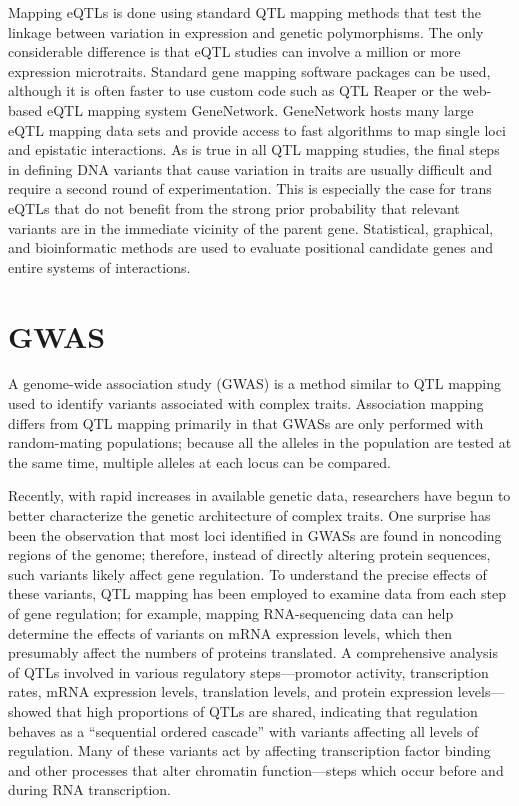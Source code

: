 Mapping eQTLs is done using standard QTL mapping methods that test the linkage between variation in expression and genetic polymorphisms. The only considerable difference is that eQTL studies can involve a million or more expression microtraits. Standard gene mapping software packages can be used, although it is often faster to use custom code such as QTL Reaper or the web-based eQTL mapping system GeneNetwork. GeneNetwork hosts many large eQTL mapping data sets and provide access to fast algorithms to map single loci and epistatic interactions. As is true in all QTL mapping studies, the final steps in defining DNA variants that cause variation in traits are usually difficult and require a second round of experimentation. This is especially the case for trans eQTLs that do not benefit from the strong prior probability that relevant variants are in the immediate vicinity of the parent gene. Statistical, graphical, and bioinformatic methods are used to evaluate positional candidate genes and entire systems of interactions.

\hypertarget{gwas}{%
\section{GWAS}\label{gwas}}

A genome-wide association study (GWAS) is a method similar to QTL mapping used to identify variants associated with complex traits. Association mapping differs from QTL mapping primarily in that GWASs are only performed with random-mating populations; because all the alleles in the population are tested at the same time, multiple alleles at each locus can be compared.

Recently, with rapid increases in available genetic data, researchers have begun to better characterize the genetic architecture of complex traits. One surprise has been the observation that most loci identified in GWASs are found in noncoding regions of the genome; therefore, instead of directly altering protein sequences, such variants likely affect gene regulation. To understand the precise effects of these variants, QTL mapping has been employed to examine data from each step of gene regulation; for example, mapping RNA-sequencing data can help determine the effects of variants on mRNA expression levels, which then presumably affect the numbers of proteins translated. A comprehensive analysis of QTLs involved in various regulatory steps---promotor activity, transcription rates, mRNA expression levels, translation levels, and protein expression levels---showed that high proportions of QTLs are shared, indicating that regulation behaves as a ``sequential ordered cascade'' with variants affecting all levels of regulation. Many of these variants act by affecting transcription factor binding and other processes that alter chromatin function---steps which occur before and during RNA transcription.


